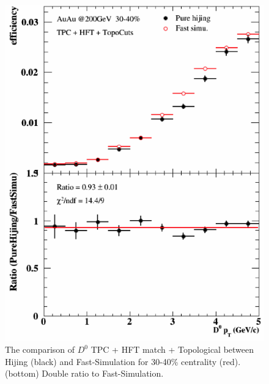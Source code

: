 \begin{figure}[htbp]
\begin{minipage}[htbp]{0.47\linewidth}
\centering
\includegraphics[width=1.0\textwidth,angle=0]{figure/Run14_D0HFT/30_40.png}
\caption{ The comparison of $D^0$ TPC + HFT match + Topological between Hijing (black) and Fast-Simulation for 30-40\% centrality (red). (bottom) Double ratio to Fast-Simulation.\label{30_40}}
\end{minipage}
\hfill
\begin{minipage}[htbp]{0.47\linewidth}
\centering

\end{minipage}
\end{figure}
